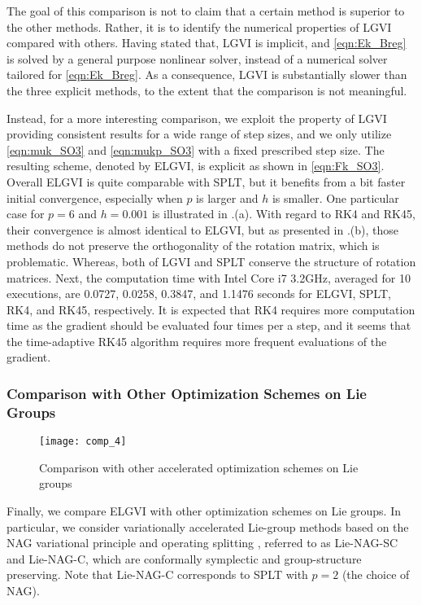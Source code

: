 \documentclass[letterpaper, 10pt, conference]{ieeeconf}
\begin{document}
The goal of this comparison is not to claim that a certain method is superior to the other methods.
Rather, it is to identify the numerical properties of LGVI compared with others. 
Having stated that, LGVI is implicit, and \eqref{eqn:Ek_Breg} is solved by a general purpose nonlinear solver, instead of a numerical solver tailored for \eqref{eqn:Ek_Breg}.
As a consequence, LGVI is substantially slower than the three explicit methods, to the extent that the comparison is not meaningful. 

Instead, for a more interesting comparison, we exploit the property of LGVI providing consistent results for a wide range of step sizes, and we only utilize \eqref{eqn:muk_SO3} and \eqref{eqn:mukp_SO3} with a fixed prescribed step size. 
The resulting scheme, denoted by ELGVI, is explicit as shown in \eqref{eqn:Fk_SO3}.
Overall ELGVI is quite comparable with SPLT, but it benefits from a bit faster initial convergence, especially when $p$ is larger and $h$ is smaller. 
One particular case for $p=6$ and $h=0.001$ is illustrated in .(a).
With regard to RK4 and RK45, their convergence is almost identical to ELGVI, but as presented in .(b), those methods do not preserve the orthogonality of the rotation matrix, which is problematic.  
Whereas, both of LGVI and SPLT conserve the structure of rotation matrices. 
Next, the computation time with Intel Core i7 3.2GHz, averaged for 10 executions, are 0.0727, 0.0258, 0.3847, and 1.1476 seconds for ELGVI, SPLT, RK4, and RK45, respectively. 
It is expected that RK4 requires more computation time as the gradient should be evaluated four times per a step, and it seems that the time-adaptive RK45 algorithm requires more frequent evaluations of the gradient. 

\subsubsection{Comparison with Other Optimization Schemes on Lie Groups}

\begin{figure}
    \centerline{
        \texttt{[image: comp\_4]}
    }
    \caption{Comparison with other accelerated optimization schemes on Lie groups}\label{fig:comp_accel}
\end{figure}

Finally, we compare ELGVI with other optimization schemes on Lie groups. 
In particular, we consider variationally accelerated Lie-group methods based on the NAG variational principle and operating splitting \cite{tao2020variational},  referred to as Lie-NAG-SC and Lie-NAG-C, which are conformally symplectic and group-structure preserving. Note that Lie-NAG-C corresponds to SPLT with $p=2$ (the choice of NAG).
\end{document}
